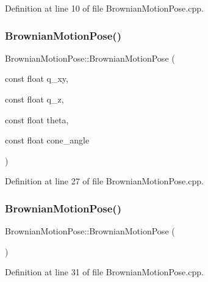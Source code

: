 Definition at line 10 of file Brownian\+Motion\+Pose.\+cpp.

\mbox{\label{classBrownianMotionPose_a033bba640c6452cf0c092abdfa255476}} 
\subsubsection{\texorpdfstring{Brownian\+Motion\+Pose()}{BrownianMotionPose()}\hspace{0.1cm}{\footnotesize\ttfamily [2/5]}}
{\footnotesize\ttfamily Brownian\+Motion\+Pose\+::\+Brownian\+Motion\+Pose (\begin{DoxyParamCaption}\item[{const float}]{q\+\_\+xy,  }\item[{const float}]{q\+\_\+z,  }\item[{const float}]{theta,  }\item[{const float}]{cone\+\_\+angle }\end{DoxyParamCaption})\hspace{0.3cm}{\ttfamily [noexcept]}}



Definition at line 27 of file Brownian\+Motion\+Pose.\+cpp.

\mbox{\label{classBrownianMotionPose_a042a889f5458b823f067ec600c0ef7b1}} 
\subsubsection{\texorpdfstring{Brownian\+Motion\+Pose()}{BrownianMotionPose()}\hspace{0.1cm}{\footnotesize\ttfamily [3/5]}}
{\footnotesize\ttfamily Brownian\+Motion\+Pose\+::\+Brownian\+Motion\+Pose (\begin{DoxyParamCaption}{ }\end{DoxyParamCaption})\hspace{0.3cm}{\ttfamily [noexcept]}}



Definition at line 31 of file Brownian\+Motion\+Pose.\+cpp.

